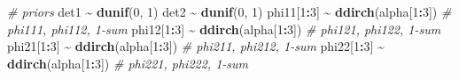 \documentclass[
  12pt,
]{krantz}
\newenvironment{Shaded}{\begin{snugshade}}{\end{snugshade}}
\newcommand{\CommentTok}[1]{\textcolor[rgb]{0.56,0.35,0.01}{\textit{#1}}}
\newcommand{\DecValTok}[1]{\textcolor[rgb]{0.00,0.00,0.81}{#1}}
\newcommand{\FunctionTok}[1]{\textcolor[rgb]{0.13,0.29,0.53}{\textbf{#1}}}
\newcommand{\NormalTok}[1]{#1}
\newcommand{\SpecialCharTok}[1]{\textcolor[rgb]{0.81,0.36,0.00}{\textbf{#1}}}
\begin{document}
\begin{Shaded}
\begin{Highlighting}[]
  \CommentTok{\# priors}
\NormalTok{  det1 }\SpecialCharTok{\textasciitilde{}} \FunctionTok{dunif}\NormalTok{(}\DecValTok{0}\NormalTok{, }\DecValTok{1}\NormalTok{)}
\NormalTok{  det2 }\SpecialCharTok{\textasciitilde{}} \FunctionTok{dunif}\NormalTok{(}\DecValTok{0}\NormalTok{, }\DecValTok{1}\NormalTok{)}
\NormalTok{  phi11[}\DecValTok{1}\SpecialCharTok{:}\DecValTok{3}\NormalTok{] }\SpecialCharTok{\textasciitilde{}} \FunctionTok{ddirch}\NormalTok{(alpha[}\DecValTok{1}\SpecialCharTok{:}\DecValTok{3}\NormalTok{]) }\CommentTok{\# phi111, phi112, 1{-}sum}
\NormalTok{  phi12[}\DecValTok{1}\SpecialCharTok{:}\DecValTok{3}\NormalTok{] }\SpecialCharTok{\textasciitilde{}} \FunctionTok{ddirch}\NormalTok{(alpha[}\DecValTok{1}\SpecialCharTok{:}\DecValTok{3}\NormalTok{]) }\CommentTok{\# phi121, phi122, 1{-}sum}
\NormalTok{  phi21[}\DecValTok{1}\SpecialCharTok{:}\DecValTok{3}\NormalTok{] }\SpecialCharTok{\textasciitilde{}} \FunctionTok{ddirch}\NormalTok{(alpha[}\DecValTok{1}\SpecialCharTok{:}\DecValTok{3}\NormalTok{]) }\CommentTok{\# phi211, phi212, 1{-}sum}
\NormalTok{  phi22[}\DecValTok{1}\SpecialCharTok{:}\DecValTok{3}\NormalTok{] }\SpecialCharTok{\textasciitilde{}} \FunctionTok{ddirch}\NormalTok{(alpha[}\DecValTok{1}\SpecialCharTok{:}\DecValTok{3}\NormalTok{]) }\CommentTok{\# phi221, phi222, 1{-}sum}
  

\end{Highlighting}
\end{Shaded}
\end{document}
